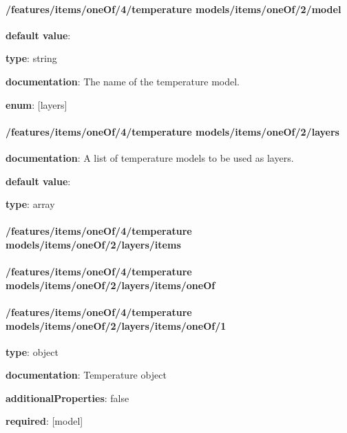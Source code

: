 \paragraph{/features/items/oneOf/4/temperature models/items/oneOf/2/model} \begin{itemized}
\item {\bf default value}: 
\item {\bf type}: string
\item {\bf documentation}: The name of the temperature model.
\item {\bf enum}: [layers]\end{itemized}\paragraph{/features/items/oneOf/4/temperature models/items/oneOf/2/layers} \begin{itemized}
\item {\bf documentation}: A list of temperature models to be used as layers.
\item {\bf default value}: 
\item {\bf type}: array
\paragraph{/features/items/oneOf/4/temperature models/items/oneOf/2/layers/items} \begin{itemized}
\end{itemized}\end{itemized}\paragraph{/features/items/oneOf/4/temperature models/items/oneOf/2/layers/items/oneOf} \begin{itemized}
\end{itemized}\paragraph{/features/items/oneOf/4/temperature models/items/oneOf/2/layers/items/oneOf/1} \begin{itemized}
\item {\bf type}: object
\item {\bf documentation}: Temperature object
\item {\bf additionalProperties}: false
\item {\bf required}: [model]\end{itemized}
